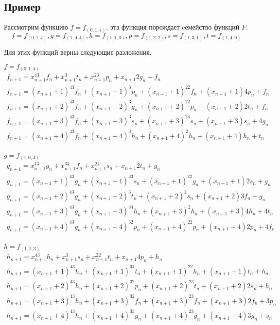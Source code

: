 \documentclass[bibliography=totoc, a4paper, 14pt]{extarticle}
\begin{document}
\subsection{Пример}
Рассмотрим функцию $f=f_{(0,1,4)}$, эта функция порождает cемейство функций $F$:
$$
f=f_{(0,1,4)}, g=f_{(1,0,4)}, h=f_{(1,1,3)}, p=f_{(1,2,2)}, s=f_{(1,3,1)}, t=f_{(1,4,0)}
$$

Для этих функций верны следующие разложения.

$f=f_{(0,1,4)}$
$$
\begin{array}{l}
f_{n+1} = x_{n+1}^43f_{n} + x_{n+1}^3t_{n} + x_{n+1}^23p_{n} + x_{n+1}2g_{n} + f_{n} \\
f_{n+1} = (x_{n+1}+1)^43f_{n} + (x_{n+1}+1)^3p_{n} + (x_{n+1}+1)^22f_{n} + (x_{n+1}+1)4p_{n} + f_{n} \\
f_{n+1} = (x_{n+1}+2)^43f_{n} + (x_{n+1}+2)^3g_{n} + (x_{n+1}+2)^22p_{n} + (x_{n+1}+2)2t_{n} + f_{n} \\
f_{n+1} = (x_{n+1}+3)^43f_{n} + (x_{n+1}+3)^3s_{n} + (x_{n+1}+3)^24s_{n} + (x_{n+1}+3)s_{n} + 4g_{n} \\
f_{n+1} = (x_{n+1}+4)^43f_{n} + (x_{n+1}+4)^3h_{n} + (x_{n+1}+4)^2h_{n} + (x_{n+1}+4)h_{n} + t_{n} \\
\end{array}
$$

$g=f_{(1,0,4)}$
$$
\begin{array}{l}
g_{n+1} = x_{n+1}^43g_{n} + x_{n+1}^34f_{n} + x_{n+1}^24s_{n} + x_{n+1}2t_{n} + g_{n} \\
g_{n+1} = (x_{n+1}+1)^43g_{n} + (x_{n+1}+1)^33s_{n} + (x_{n+1}+1)^22g_{n} + (x_{n+1}+1)2s_{n} + g_{n} \\
g_{n+1} = (x_{n+1}+2)^43g_{n} + (x_{n+1}+2)^3t_{n} + (x_{n+1}+2)^2s_{n} + (x_{n+1}+2)3f_{n} + g_{n} \\
g_{n+1} = (x_{n+1}+3)^43g_{n} + (x_{n+1}+3)^34h_{n} + (x_{n+1}+3)^2h_{n} + (x_{n+1}+3)4h_{n} + 4t_{n} \\
g_{n+1} = (x_{n+1}+4)^43g_{n} + (x_{n+1}+4)^32p_{n} + (x_{n+1}+4)^22p_{n} + (x_{n+1}+4)2p_{n} + 4f_{n} \\
\end{array}
$$

$h=f_{(1,1,3)}$
$$
\begin{array}{l}
h_{n+1} = x_{n+1}^43h_{n} + x_{n+1}^3s_{n} + x_{n+1}^22t_{n} + x_{n+1}4p_{n} + h_{n} \\
h_{n+1} = (x_{n+1}+1)^43h_{n} + (x_{n+1}+1)^34t_{n} + (x_{n+1}+1)^22h_{n} + (x_{n+1}+1)t_{n} + h_{n} \\
h_{n+1} = (x_{n+1}+2)^43h_{n} + (x_{n+1}+2)^32p_{n} + (x_{n+1}+2)^23t_{n} + (x_{n+1}+2)2s_{n} + h_{n} \\
h_{n+1} = (x_{n+1}+3)^43h_{n} + (x_{n+1}+3)^32f_{n} + (x_{n+1}+3)^23f_{n} + (x_{n+1}+3)2f_{n} + 3p_{n} \\
h_{n+1} = (x_{n+1}+4)^43h_{n} + (x_{n+1}+4)^33g_{n} + (x_{n+1}+4)^23g_{n} + (x_{n+1}+4)3g_{n} + s_{n} \\
\end{array}
$$
\end{document}
